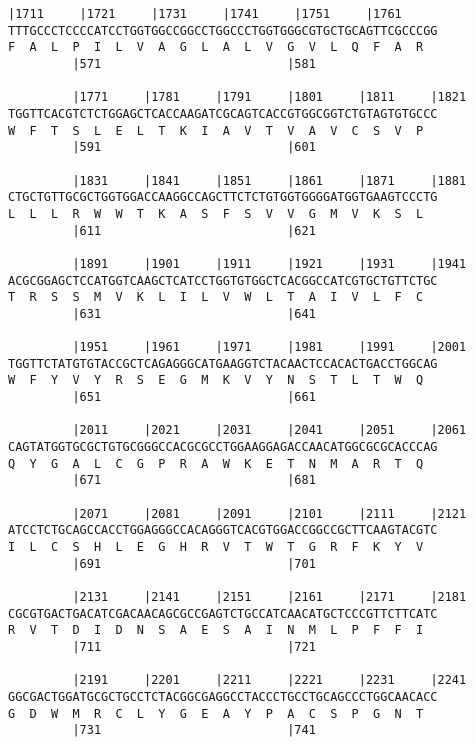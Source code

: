 \documentclass{article}
\begin{document}
\newpage
\begin{Verbatim}[fontfamily=courier]
         |1711     |1721     |1731     |1741     |1751     |1761
TTTGCCCTCCCCATCCTGGTGGCCGGCCTGGCCCTGGTGGGCGTGCTGCAGTTCGCCCGG
F  A  L  P  I  L  V  A  G  L  A  L  V  G  V  L  Q  F  A  R  
         |571                          |581                 

         |1771     |1781     |1791     |1801     |1811     |1821
TGGTTCACGTCTCTGGAGCTCACCAAGATCGCAGTCACCGTGGCGGTCTGTAGTGTGCCC
W  F  T  S  L  E  L  T  K  I  A  V  T  V  A  V  C  S  V  P  
         |591                          |601                 

         |1831     |1841     |1851     |1861     |1871     |1881
CTGCTGTTGCGCTGGTGGACCAAGGCCAGCTTCTCTGTGGTGGGGATGGTGAAGTCCCTG
L  L  L  R  W  W  T  K  A  S  F  S  V  V  G  M  V  K  S  L  
         |611                          |621                 

         |1891     |1901     |1911     |1921     |1931     |1941
ACGCGGAGCTCCATGGTCAAGCTCATCCTGGTGTGGCTCACGGCCATCGTGCTGTTCTGC
T  R  S  S  M  V  K  L  I  L  V  W  L  T  A  I  V  L  F  C  
         |631                          |641                 

         |1951     |1961     |1971     |1981     |1991     |2001
TGGTTCTATGTGTACCGCTCAGAGGGCATGAAGGTCTACAACTCCACACTGACCTGGCAG
W  F  Y  V  Y  R  S  E  G  M  K  V  Y  N  S  T  L  T  W  Q  
         |651                          |661                 

         |2011     |2021     |2031     |2041     |2051     |2061
CAGTATGGTGCGCTGTGCGGGCCACGCGCCTGGAAGGAGACCAACATGGCGCGCACCCAG
Q  Y  G  A  L  C  G  P  R  A  W  K  E  T  N  M  A  R  T  Q  
         |671                          |681                 

         |2071     |2081     |2091     |2101     |2111     |2121
ATCCTCTGCAGCCACCTGGAGGGCCACAGGGTCACGTGGACCGGCCGCTTCAAGTACGTC
I  L  C  S  H  L  E  G  H  R  V  T  W  T  G  R  F  K  Y  V  
         |691                          |701                 

         |2131     |2141     |2151     |2161     |2171     |2181
CGCGTGACTGACATCGACAACAGCGCCGAGTCTGCCATCAACATGCTCCCGTTCTTCATC
R  V  T  D  I  D  N  S  A  E  S  A  I  N  M  L  P  F  F  I  
         |711                          |721                 

         |2191     |2201     |2211     |2221     |2231     |2241
GGCGACTGGATGCGCTGCCTCTACGGCGAGGCCTACCCTGCCTGCAGCCCTGGCAACACC
G  D  W  M  R  C  L  Y  G  E  A  Y  P  A  C  S  P  G  N  T  
         |731                          |741                 

\end{Verbatim}
\end{document}
